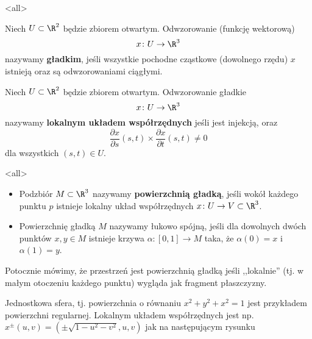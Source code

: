 \mode*
\mode<all>{}

\begin{frame}[<+->]
\begin{definicja}
Niech $U\subset\R^2$ będzie zbiorem otwartym. Odwzorowanie (funkcję wektorową) 
\[x\colon U\to \R^3\] nazywamy \textbf{gładkim}, jeśli wszystkie pochodne 
cząstkowe (dowolnego rzędu) $x$ istnieją oraz są odwzorowaniami ciągłymi.
\end{definicja}

\begin{definicja}
Niech $U\subset \R^2$ będzie zbiorem otwartym. Odwzorowanie gładkie
\[x\colon U\to \R^3\]
nazywamy \textbf{lokalnym układem współrzędnych} jeśli jest injekcją, oraz 
\[\frac{\partial x}{\partial s}(s,t)\times \frac{\partial x}{\partial 
t}(s,t)\neq 0\] dla wszystkich $(s,t)\in U$.
\end{definicja}

\end{frame}
\mode<all>{}
\begin{frame}

\begin{definicja}\label{def:surface}
\begin{itemize}
\item 
Podzbiór $M\subset \R^3$ nazywamy \textbf{powierzchnią gładką}, jeśli wokół 
każdego punktu $p$ istnieje lokalny układ współrzędnych $x\colon U\to V\subset 
\R^3$. 

% 
\pause \item Powierzchnię gładką $M$ nazywamy łukowo spójną, jeśli dla dowolnych 
dwóch 
punktów $x,y\in M$ istnieje krzywa $\alpha\colon [0,1]\to M$ taka, że 
$\alpha(0)=x$ i $\alpha(1)=y$.
\end{itemize}
\end{definicja}

\pause Potocznie mówimy, że przestrzeń jest powierzchnią gładką jeśli 
,,lokalnie'' (tj. w małym otoczeniu każdego punktu) wygląda jak fragment 
płaszczyzny.


\end{frame}
\begin{frame}[<+->]

\begin{przyklad}
Jednostkowa sfera, tj. powierzchnia o równaniu $x^2+y^2+x^2=1$ jest przykładem 
powierzchni regularnej. Lokalnym układem współrzędnych jest np. 
$x^\pm(u,v)=(\pm\sqrt{1-u^2-v^2},u,v)$ jak na następującym rysunku

\begin{center}

\end{center}
\end{przyklad}

\end{frame}
